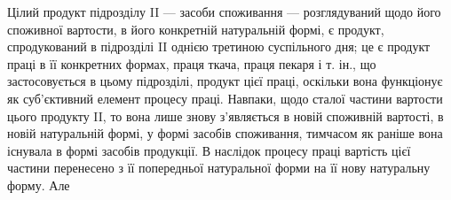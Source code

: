 Цілий продукт підрозділу II — засоби споживання — розглядуваний щодо
його споживної вартости, в його конкретній натуральній формі, є продукт,
спродукований в підрозділі II однією третиною суспільного дня;
це є продукт праці в її конкретних формах, праця ткача, праця пекаря
і т. ін., що застосовується в цьому підрозділі, продукт цієї праці, оскільки
вона функціонує як суб’єктивний елемент процесу праці. Навпаки,
щодо сталої частини вартости цього продукту II, то вона лише знову
з’являється в новій споживній вартості, в новій натуральній формі, у
формі засобів споживання, тимчасом як раніше вона існувала в формі засобів
продукції. В наслідок процесу праці вартість цієї частини перенесено
з її попередньої натуральної форми на її нову натуральну форму. Але
\parbreak{}  %
